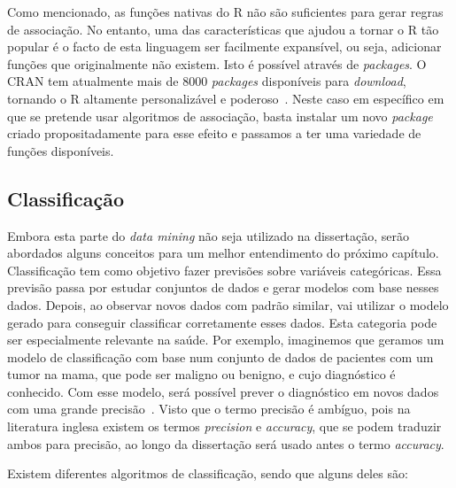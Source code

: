 Como mencionado, as funções nativas do R não são suficientes para gerar regras de associação. No entanto, uma das características que ajudou a tornar o R tão popular é o facto de esta linguagem ser facilmente expansível, ou seja, adicionar funções que originalmente não existem. Isto é possível através de \textit{packages}.
O \ac{CRAN} tem atualmente mais de 8000 \textit{packages} disponíveis para \textit{download}, tornando o R altamente personalizável e poderoso~\cite{cran}.
Neste caso em específico em que se pretende usar algoritmos de associação, basta instalar um novo \textit{package} criado propositadamente para esse efeito e passamos a ter uma variedade de funções disponíveis. 

\subsection{Classificação}

Embora esta parte do \textit{data mining} não seja utilizado na dissertação, serão abordados alguns conceitos para um melhor entendimento do próximo capítulo.
Classificação tem como objetivo fazer previsões sobre variáveis categóricas. Essa previsão passa por estudar conjuntos de dados e gerar modelos com base nesses dados. Depois, ao observar novos dados com padrão similar, vai utilizar o modelo gerado para conseguir classificar corretamente esses dados. Esta categoria pode ser especialmente relevante na saúde. Por exemplo, imaginemos que geramos um modelo de classificação com base num conjunto de dados de pacientes com um tumor na mama, que pode ser maligno ou benigno, e cujo diagnóstico é conhecido. Com esse modelo, será possível prever o diagnóstico em novos dados com uma grande precisão~\cite{cancerpred}. Visto que o termo precisão é ambíguo, pois na literatura inglesa existem os termos \textit{precision} e \textit{accuracy}, que se podem traduzir ambos para precisão, ao longo da dissertação será usado antes o termo \textit{accuracy}.

Existem diferentes algoritmos de classificação, sendo que alguns deles são:

